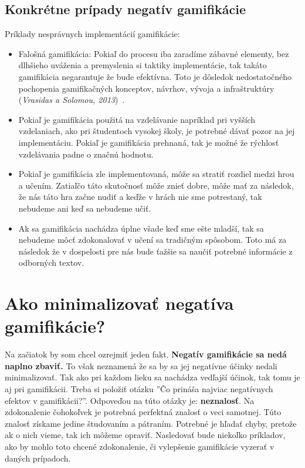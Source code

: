 \documentclass[10pt,oneside,slovak,a4paper]{article}
\begin{document}
\subsection{Konkrétne prípady negatív gamifikácie} \label{NegativnePriklady}

Príklady nesprávnych implementácií gamifikácie:
\begin{itemize}
\item Falošná gamifikácia: Pokiaľ do procesu iba zaradíme zábavné elementy, bez dlhšieho uváženia a premyslenia si taktiky implementácie, tak takáto gamifikácia negarantuje že bude efektívna. Toto je dôsledok nedostatočného pochopenia gamifikačných konceptov, návrhov, vývoja a infraštruktúry (\emph{Vrasidas a Solomou, 2013})~\cite{doi:10.1080/09523987.2013.839151}.
\item Pokiaľ je gamifikácia použitá na vzdelávanie napríklad pri vyšších vzdelaniach, ako pri študentoch vysokej školy, je potrebné dávať pozor na jej implementáciu. Pokiaľ je gamifikácia prehnaná, tak je možné že rýchlosť vzdelávania padne o značnú hodnotu.
\item Pokiaľ je gamifikácia zle implementovaná, môže sa stratiť rozdiel medzi hrou a učením. Zatiaľčo táto skutočnosť môže znieť dobre, môže mať za následok, že nás táto hra začne nudiť a keďže v hrách nie sme potrestaný, tak nebudeme ani keď sa nebudeme učiť.
\item Ak sa gamifikácia nachádza úplne všade keď sme ešte mladší, tak sa nebudeme môcť zdokonalovať v učení sa tradičným spôsobom. Toto má za následok že v dospelosti pre nás bude ťažšie sa naučiť potrebné informácie z odborných textov.
\end{itemize}




\section{Ako minimalizovať negatíva gamifikácie?} \label{MinimalizovanieNegatGamif}

Na začiatok by som chcel ozrejmiť jeden fakt. \textbf{Negatív gamifikácie sa nedá naplno zbaviť.} To však neznamená že sa by sa jej negatívne účinky nedali minimalizovať. Tak ako pri každom lieku sa nachádza vedľajší účinok, tak tomu je aj pri gamifikácii. Treba si položiť otázku ''Čo prináša najviac negatívnych efektov v gamifikácii?''. Odpoveďou na túto otázky je: \textbf{neznalosť}. Na zdokonalenie čohokoľvek je potrebná perfektná znalosť o veci samotnej. Túto znalosť získame jedine študovaním a pátraním. Potrebné je hľadať chyby, pretože ak o nich vieme, tak ich môžeme opraviť. Nasledovať bude niekoľko príkladov, ako by mohlo toto chcené zdokonalenie, či vylepšenie gamifikácie vyzerať v daných prípadoch.
\end{document}
